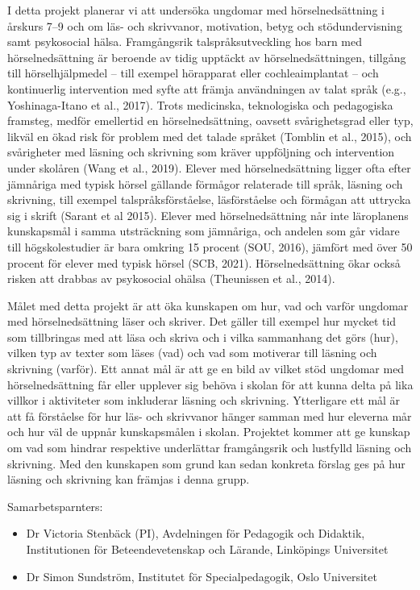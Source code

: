 \documentclass[]{article}
\providecommand{\tightlist}{%
  \setlength{\itemsep}{0pt}\setlength{\parskip}{0pt}}
\begin{document}
I detta projekt planerar vi att undersöka ungdomar med hörselnedsättning
i årskurs 7--9 och om läs- och skrivvanor, motivation, betyg och
stödundervisning samt psykosocial hälsa. Framgångsrik
talspråksutveckling hos barn med hörselnedsättning är beroende av tidig
upptäckt av hörselnedsättningen, tillgång till hörselhjälpmedel -- till
exempel hörapparat eller cochleaimplantat -- och kontinuerlig
intervention med syfte att främja användningen av talat språk (e.g.,
Yoshinaga-Itano et al., 2017). Trots medicinska, teknologiska och
pedagogiska framsteg, medför emellertid en hörselnedsättning, oavsett
svårighetsgrad eller typ, likväl en ökad risk för problem med det talade
språket (Tomblin et al., 2015), och svårigheter med läsning och
skrivning som kräver uppföljning och intervention under skolåren (Wang
et al., 2019). Elever med hörselnedsättning ligger ofta efter jämnåriga
med typisk hörsel gällande förmågor relaterade till språk, läsning och
skrivning, till exempel talspråksförståelse, läsförståelse och förmågan
att uttrycka sig i skrift (Sarant et al 2015). Elever med
hörselnedsättning når inte läroplanens kunskapsmål i samma utsträckning
som jämnåriga, och andelen som går vidare till högskolestudier är bara
omkring 15 procent (SOU, 2016), jämfört med över 50 procent för elever
med typisk hörsel (SCB, 2021). Hörselnedsättning ökar också risken att
drabbas av psykosocial ohälsa (Theunissen et al., 2014).

Målet med detta projekt är att öka kunskapen om hur, vad och varför
ungdomar med hörselnedsättning läser och skriver. Det gäller till
exempel hur mycket tid som tillbringas med att läsa och skriva och i
vilka sammanhang det görs (hur), vilken typ av texter som läses (vad)
och vad som motiverar till läsning och skrivning (varför). Ett annat mål
är att ge en bild av vilket stöd ungdomar med hörselnedsättning får
eller upplever sig behöva i skolan för att kunna delta på lika villkor i
aktiviteter som inkluderar läsning och skrivning. Ytterligare ett mål är
att få förståelse för hur läs- och skrivvanor hänger samman med hur
eleverna mår och hur väl de uppnår kunskapsmålen i skolan. Projektet
kommer att ge kunskap om vad som hindrar respektive underlättar
framgångsrik och lustfylld läsning och skrivning. Med den kunskapen som
grund kan sedan konkreta förslag ges på hur läsning och skrivning kan
främjas i denna grupp.

Samarbetsparnters:

\begin{itemize}
\tightlist
\item
  Dr Victoria Stenbäck (PI), Avdelningen för Pedagogik och Didaktik,
  Institutionen för Beteendevetenskap och Lärande, Linköpings
  Universitet
\item
  Dr Simon Sundström, Institutet för Specialpedagogik, Oslo Universitet
\end{itemize}
\end{document}
